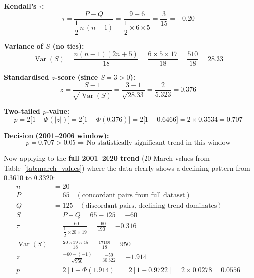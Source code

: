 \documentclass[12pt, a4paper]{article}
\begin{document}
\textbf{Kendall's $\tau$:}
\begin{equation}
  \tau = \frac{P - Q}{\dfrac{1}{2}\,n\,(n-1)}
  = \frac{9 - 6}{\dfrac{1}{2} \times 6 \times 5}
  = \frac{3}{15} = \boxed{+0.20}
  \label{eq:tau_2001_2006}
\end{equation}

\textbf{Variance of $S$ (no ties):}
\begin{equation}
  \operatorname{Var}(S) =
  \frac{n(n-1)(2n+5)}{18}
  = \frac{6 \times 5 \times 17}{18}
  = \frac{510}{18} = 28.33
  \label{eq:var_S}
\end{equation}

\textbf{Standardised $z$-score (since $S = 3 > 0$):}
\begin{equation}
  z = \frac{S - 1}{\sqrt{\operatorname{Var}(S)}}
  = \frac{3 - 1}{\sqrt{28.33}}
  = \frac{2}{5.323}
  = \boxed{0.376}
  \label{eq:z_score}
\end{equation}

\textbf{Two-tailed $p$-value:}
\begin{equation}
  p = 2\bigl[1 - \Phi(|z|)\bigr]
  = 2\bigl[1 - \Phi(0.376)\bigr]
  = 2\bigl[1 - 0.6466\bigr]
  = 2 \times 0.3534
  = \boxed{0.707}
  \label{eq:p_value_early}
\end{equation}

\textbf{Decision (2001--2006 window):}
\begin{equation}
  p = 0.707 > 0.05
  \Rightarrow \text{No statistically significant trend in this window}
  \label{eq:decision_early}
\end{equation}

Now applying to the \textbf{full 2001--2020 trend} (20 March values
from Table~\ref{tab:march_values}) where the data clearly shows a
declining pattern from 0.3610 to 0.3320:
\begin{align}
  n &= 20 \nonumber\\
  P &= 65 \quad (\text{concordant pairs from full dataset})
  \label{eq:P_full}\\
  Q &= 125 \quad (\text{discordant pairs, declining trend dominates})
  \label{eq:Q_full}\\
  S &= P - Q = 65 - 125 = -60
  \label{eq:S_full}\\
  \tau &= \frac{-60}{\dfrac{1}{2}\times 20 \times 19}
  = \frac{-60}{190} = \boxed{-0.316}
  \label{eq:tau_full}\\
  \operatorname{Var}(S) &=
  \frac{20 \times 19 \times 45}{18} = \frac{17100}{18} = 950
  \label{eq:var_full}\\
  z &= \frac{-60 - (-1)}{\sqrt{950}}
  = \frac{-59}{30.822} = \boxed{-1.914}
  \label{eq:z_full}\\
  p &= 2[1 - \Phi(1.914)] = 2[1 - 0.9722] = 2 \times 0.0278
  = \boxed{0.0556}
  \label{eq:p_full}
\end{align}
\end{document}
